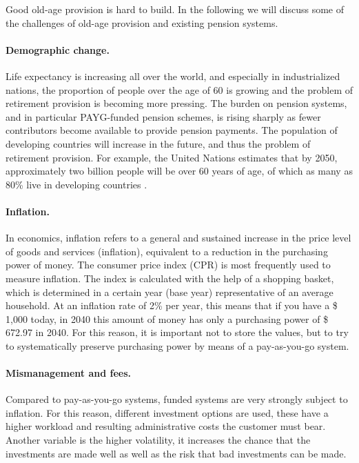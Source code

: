Good old-age provision is hard to build. In the following we will discuss some of the challenges of old-age provision and existing pension systems.

\paragraph{Demographic change.} Life expectancy is increasing all over the world, and especially in industrialized nations, the proportion of people over the age of 60 is growing and the problem of retirement provision is becoming more pressing. The burden on pension systems, and in particular PAYG-funded pension schemes, is rising sharply as fewer contributors become available to provide pension payments. The population of developing countries will increase in the future, and thus the problem of retirement provision. For example, the United Nations estimates that by 2050, approximately two billion people will be over 60 years of age, of which as many as 80\% live in developing countries
\cite{noauthor_pensions_2009}.


\paragraph{Inflation.}  In economics, inflation refers to a general and sustained increase in the price level of goods and services (inflation), equivalent to a reduction in the purchasing power of money. The consumer price index (CPR) is most frequently used to measure inflation. The index is calculated with the help of a shopping basket, which is determined in a certain year (base year) representative of an average household. \cite{inflation} 
At an inflation rate of 2\% per year, this means that if you have a \$ 1,000 today,  in 2040 this amount of money has only a purchasing power of \$ 672.97 in 2040. 
For this reason, it is important not to store the values, but to try to systematically preserve purchasing power by means of a pay-as-you-go system.

\paragraph{Mismanagement and fees.} Compared to pay-as-you-go systems, funded systems are very strongly subject to inflation. For this reason, different investment options are used, these have a higher workload and resulting administrative costs the customer must bear. Another variable is the higher volatility, it increases the chance that the investments are made well as well as the risk that bad investments can be made.

